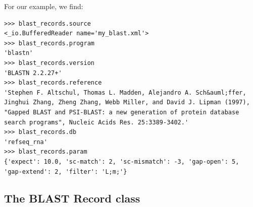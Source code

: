 For our example, we find:
\begin{verbatim}
>>> blast_records.source
<_io.BufferedReader name='my_blast.xml'>
>>> blast_records.program
'blastn'
>>> blast_records.version
'BLASTN 2.2.27+'
>>> blast_records.reference
'Stephen F. Altschul, Thomas L. Madden, Alejandro A. Sch&auml;ffer, Jinghui Zhang, Zheng Zhang, Webb Miller, and David J. Lipman (1997), "Gapped BLAST and PSI-BLAST: a new generation of protein database search programs", Nucleic Acids Res. 25:3389-3402.'
>>> blast_records.db
'refseq_rna'
>>> blast_records.param
{'expect': 10.0, 'sc-match': 2, 'sc-mismatch': -3, 'gap-open': 5, 'gap-extend': 2, 'filter': 'L;m;'}
\end{verbatim}

\subsection{The BLAST Record class}
\label{subsec:blast-record}

